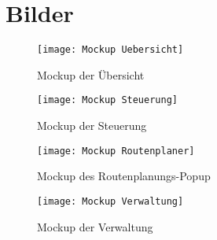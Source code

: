 \section{Bilder}
\begin{figure}[H]
    \centering
    \caption{Mockup der Übersicht}\label{fig:MockupOverview}
    \texttt{[image: Mockup Uebersicht]}
\end{figure}

\begin{figure}[H]
    \centering
    \caption{Mockup der Steuerung}\label{fig:MockupControls}
    \texttt{[image: Mockup Steuerung]}
\end{figure}

\begin{figure}[H]
    \centering
    \caption{Mockup des Routenplanungs-Popup}\label{fig:MockupRoutePlanner}
    \texttt{[image: Mockup Routenplaner]}
\end{figure}

\begin{figure}[H]
    \centering
    \caption{Mockup der Verwaltung}\label{fig:MockupAdministration}
    \texttt{[image: Mockup Verwaltung]}
\end{figure}

